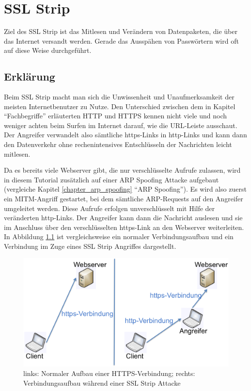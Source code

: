 \chapter{SSL Strip}
Ziel des SSL Strip ist das Mitlesen und Verändern von Datenpaketen, die über das Internet versandt werden. Gerade das Ausspähen von Passwörtern wird oft auf diese Weise durchgeführt.

\section{Erklärung}
Beim SSL Strip macht man sich die Unwissenheit und Unaufmerksamkeit der meisten Internetbenutzer zu Nutze. Den Unterschied zwischen dem in Kapitel \enquote{Fachbegriffe} erläuterten HTTP und HTTPS kennen nicht viele und noch weniger achten beim Surfen im Internet darauf, wie die URL-Leiste ausschaut. Der Angreifer verwandelt also sämtliche https-Links in http-Links und kann dann den Datenverkehr ohne rechenintensives Entschlüsseln der Nachrichten leicht mitlesen.

Da es bereits viele Webserver gibt, die nur verschlüsselte Aufrufe zulassen, wird in diesem Tutorial zusätzlich auf einer ARP Spoofing Attacke aufgebaut (vergleiche Kapitel \ref{chapter_arp_spoofing} \enquote{ARP Spoofing}). Es wird also zuerst ein MITM-Angriff gestartet, bei dem sämtliche ARP-Requests auf den Angreifer umgeleitet werden. Diese Aufrufe erfolgen unverschlüsselt mit Hilfe der veränderten http-Links. Der Angreifer kann dann die Nachricht auslesen und sie im Anschluss über den verschlüsselten https-Link an den Webserver weiterleiten. In Abbildung \ref{fig:sslstrip} ist vergleichsweise ein normaler Verbindungsaufbau und ein Verbindung im Zuge eines SSL Strip Angriffes dargestellt.

\begin{figure}
	\centering
	\includegraphics[width=\textwidth]{images/SSL_Strip/SSLStrip}
	\caption{links: Normaler Aufbau einer HTTPS-Verbindung; rechts: Verbindungsaufbau während einer SSL Strip Attacke}
	\label{fig:sslstrip}
\end{figure}

